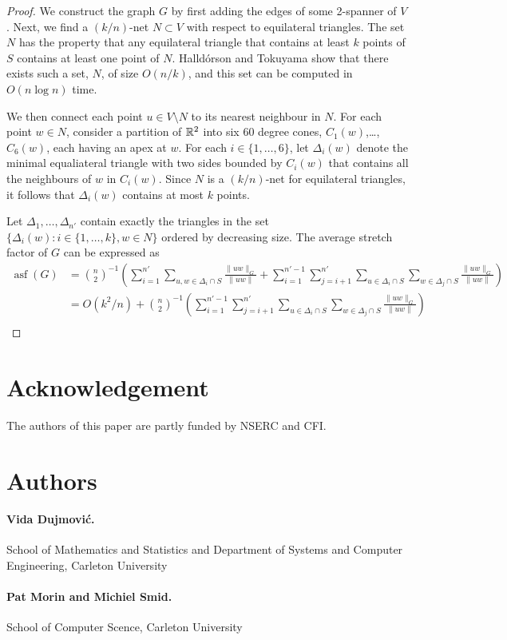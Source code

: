 \documentclass{patmorin}
\DeclareMathOperator{\asf}{asf}
\begin{document}
\begin{proof}
  We construct the graph $G$ by first adding the edges of some 2-spanner
  of $V$.  Next, we find a $(k/n)$-net $N\subset V$ with respect to
  equilateral triangles. The set $N$ has the property that any equilateral
  triangle that contains at least $k$ points of $S$ contains at least
  one point of $N$.  Halld\'orson and Tokuyama show that there exists
  such a set, $N$, of size $O(n/k)$, and this set can be computed in
  $O(n\log n)$ time.

  We then connect each point $u\in V\setminus N$ to its nearest neighbour
  in $N$.  For each point $w\in N$, consider a partition of $\mathbb{R}^2$
  into six 60 degree cones, $C_1(w)$,\ldots,$C_6(w)$, each having an
  apex at $w$.  For each $i\in \{1,\ldots,6\}$, let $\Delta_i(w)$ denote
  the minimal equaliateral triangle with two sides bounded by $C_i(w)$
  that contains all the neighbours of $w$ in $C_i(w)$.  Since $N$ is a
  $(k/n)$-net for equilateral triangles, it follows that $\Delta_i(w)$ 
  contains at most $k$ points.

  Let $\Delta_1,\ldots,\Delta_{n'}$ contain exactly the triangles in the
  set $\{\Delta_i(w):i\in\{1,\ldots,k\}, w\in N\}$ ordered by decreasing
  size.  The average stretch factor of $G$ can be expressed as
  \begin{align*}
    \asf(G) & = 
         \binom n2^{-1}\left(\sum_{i=1}^{n'}\sum_{u,w\in\Delta_i\cap S}\frac{\|uw\|_G}{\|uw\|}  
             + \sum_{i=1}^{n'-1}\sum_{j={i+1}}^{n'}\sum_{u\in\Delta_i\cap S}\sum_{w\in\Delta_j\cap S}\frac{\|uw\|_G}{\|uw\|}\right)  \\
      & = 
         O(k^2/n) + \binom n2^{-1}\left(  
             \sum_{i=1}^{n'-1}\sum_{j={i+1}}^{n'}\sum_{u\in\Delta_i\cap S}\sum_{w\in\Delta_j\cap S}\frac{\|uw\|_G}{\|uw\|}\right)  \\
   \end{align*}
\end{proof}



\section*{Acknowledgement}

The authors of this paper are partly funded by NSERC and CFI.

\section*{Authors}

\paragraph{Vida Dujmovi\'c.}
School of Mathematics and Statistics and Department of Systems and Computer Engineering, Carleton University

\paragraph{Pat Morin and Michiel Smid.}
School of Computer Scence, Carleton University




\end{document}
